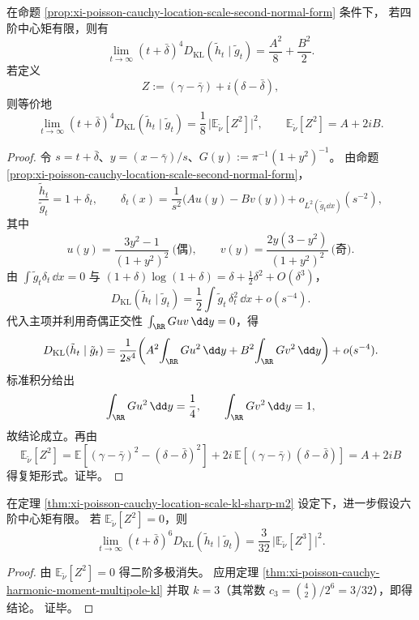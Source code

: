 \begin{theorem}[二阶熵系数的锐极限与复二阶矩分解]\label{thm:xi-poisson-cauchy-location-scale-kl-sharp-m2}
在命题 \ref{prop:xi-poisson-cauchy-location-scale-second-normal-form} 条件下，
若四阶中心矩有限，则有
\[
\lim_{t\to\infty}(t+\bar\delta)^4 D_{\mathrm{KL}}(\tilde h_t\mid \tilde g_t)
=\frac{A^2}{8}+\frac{B^2}{2}.
\]
若定义
\[
Z:=(\gamma-\bar\gamma)+i(\delta-\bar\delta),
\]
则等价地
\[
\lim_{t\to\infty}(t+\bar\delta)^4 D_{\mathrm{KL}}(\tilde h_t\mid \tilde g_t)
=\frac18\,\bigl|\mathbb E_{\tilde\nu}[Z^2]\bigr|^2,
\qquad
\mathbb E_{\tilde\nu}[Z^2]=A+2iB.
\]
\end{theorem}

\begin{proof}
令 \(s=t+\bar\delta\)、\(y=(x-\bar\gamma)/s\)、\(G(y):=\pi^{-1}(1+y^2)^{-1}\)。
由命题 \ref{prop:xi-poisson-cauchy-location-scale-second-normal-form}，
\[
\frac{\tilde h_t}{\tilde g_t}=1+\delta_t,\qquad
\delta_t(x)=\frac{1}{s^2}\bigl(Au(y)-Bv(y)\bigr)+o_{L^2(\tilde g_t\dd x)}(s^{-2}),
\]
其中
\[
u(y)=\frac{3y^2-1}{(1+y^2)^2}\ \text{(偶)},\qquad
v(y)=\frac{2y(3-y^2)}{(1+y^2)^2}\ \text{(奇)}.
\]
由 \(\int \tilde g_t\delta_t\,\dd x=0\) 与
\((1+\delta)\log(1+\delta)=\delta+\frac12\delta^2+O(\delta^3)\)，
\[
D_{\mathrm{KL}}(\tilde h_t\mid \tilde g_t)
=\frac12\int \tilde g_t\,\delta_t^2\,\dd x+o(s^{-4}).
\]
代入主项并利用奇偶正交性 \(\int_{\RR}Guv\,\dd y=0\)，得
\[
D_{\mathrm{KL}}(\tilde h_t\mid \tilde g_t)
=\frac{1}{2s^4}\!\left(
A^2\!\int_{\RR}Gu^2\,\dd y+B^2\!\int_{\RR}Gv^2\,\dd y\right)+o(s^{-4}).
\]
标准积分给出
\[
\int_{\RR}Gu^2\,\dd y=\frac14,\qquad
\int_{\RR}Gv^2\,\dd y=1,
\]
故结论成立。再由
\[
\mathbb E_{\tilde\nu}[Z^2]
=\mathbb E\!\left[(\gamma-\bar\gamma)^2-(\delta-\bar\delta)^2\right]
+2i\,\mathbb E\!\left[(\gamma-\bar\gamma)(\delta-\bar\delta)\right]
=A+2iB
\]
得复矩形式。证毕。
\end{proof}

\begin{corollary}[二阶盲点后的六次衰减常数]\label{cor:xi-poisson-cauchy-location-scale-m2-blind-m3-kl}
在定理 \ref{thm:xi-poisson-cauchy-location-scale-kl-sharp-m2} 设定下，进一步假设六阶中心矩有限。
若 \(\mathbb E_{\tilde\nu}[Z^2]=0\)，则
\[
\lim_{t\to\infty}(t+\bar\delta)^6 D_{\mathrm{KL}}(\tilde h_t\mid \tilde g_t)
=\frac{3}{32}\,\bigl|\mathbb E_{\tilde\nu}[Z^3]\bigr|^2.
\]
\end{corollary}

\begin{proof}
由 \(\mathbb E_{\tilde\nu}[Z^2]=0\) 得二阶多极消失。
应用定理 \ref{thm:xi-poisson-cauchy-harmonic-moment-multipole-kl} 并取 \(k=3\)（其常数 \(c_3=\binom42/2^6=3/32\)），即得结论。
证毕。
\end{proof}

